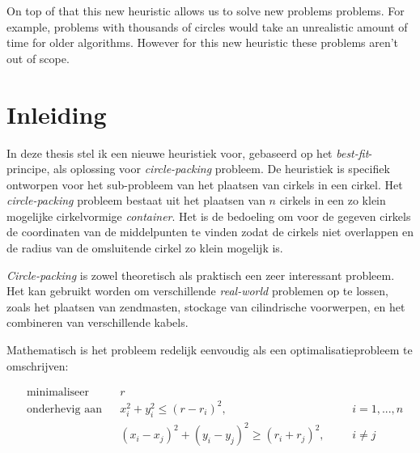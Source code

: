 \documentclass[12pt,a4paper,oneside]{book}
\begin{document}
On top of that this new heuristic allows us to solve new problems problems. 
For example, problems with thousands of circles would take an unrealistic amount of time for older algorithms.
However for this new heuristic these problems aren't out of scope.

\newpage

\tableofcontents
\listoffigures
{}
\listoftables
{}

\newpage

\setcounter{page}{0}

\chapter{Inleiding}

In deze thesis stel ik een nieuwe heuristiek voor, gebaseerd op het \textit{best-fit}-principe, als oplossing voor \textit{circle-packing} probleem.
De heuristiek is specifiek ontworpen voor het sub-probleem van het plaatsen van cirkels in een cirkel.
Het \textit{circle-packing} probleem bestaat uit het plaatsen van $n$ cirkels in een zo klein mogelijke cirkelvormige \textit{container}.
Het is de bedoeling om voor de gegeven cirkels de coordinaten van de middelpunten te vinden zodat de cirkels niet overlappen en de radius van de omsluitende cirkel zo klein mogelijk is.

\textit{Circle-packing} is zowel theoretisch als praktisch een zeer interessant probleem.
Het kan gebruikt worden om verschillende \textit{real-world} problemen op te lossen, zoals het plaatsen van zendmasten, stockage van cilindrische voorwerpen, en het combineren van verschillende kabels. 

Mathematisch is het probleem redelijk eenvoudig als een optimalisatieprobleem te omschrijven:

\begin{equation*}
\begin{aligned}
& \text{minimaliseer}
& & r \\
& \text{onderhevig aan}
& & x_i^2 + y_i^2 \leq (r-r_i)^2, 
& & &i = {1,...,n}\\
&&& (x_i - x_j)^2 + (y_i - y_j)^2 \geq (r_i + r_j)^2,
& & &i \neq j
\end{aligned}
\end{equation*}
\end{document}
